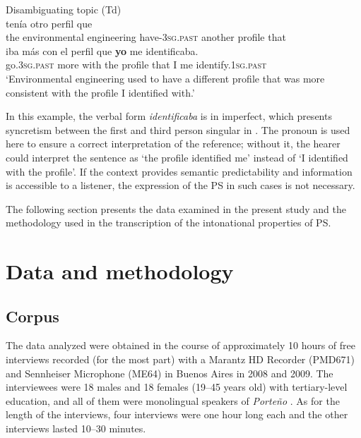 \documentclass[output=paper]{langsci/langscibook}
\begin{document}
\ea\label{ex:pes:9}
             Disambiguating topic (Td)\\
\gll{} tenía otro perfil    que\\
     the environmental engineering  have-\textsc{3sg}.\textsc{past} another profile  that\\
     
\gll  iba         más  con el perfil    que \textbf{{yo}} me  identificaba.\\
     go.\textsc{3sg}.\textsc{past}  more with the profile  that  I  me  identify.\textsc{1sg}.\textsc{past}\\
\glt ‘Environmental engineering used to have a different profile that was more consistent with the profile I identified with.’
\z

In this example, the verbal form \textit{identificaba} is in imperfect, which presents syncretism between the first and third person singular in . The pronoun is used here to ensure a correct interpretation of the reference; without it, the hearer could interpret the sentence as ‘the profile identified me’ instead of ‘I identified with the profile’. If the context provides semantic predictability and information is accessible to a listener, the expression of the PS in such cases is not necessary.

The following section presents the data examined in the present study and the methodology used in the transcription of the intonational properties of PS.

\section{Data and methodology}
\label{sec:pes:3}
\subsection{Corpus}
\label{sec:pes:3.1}
The data analyzed were obtained in the course of approximately 10 hours of free interviews recorded (for the most part) with a Marantz HD Recorder (PMD671) and Sennheiser Microphone (ME64) in Buenos Aires in 2008 and 2009. The interviewees were 18 males and 18 females (19–45 years old) with tertiary-level education, and all of them were monolingual speakers of \textit{Porte{\~n}o} . As for the length of the interviews, four interviews were one hour long each and the other interviews lasted 10–30 minutes.\largerpage
\end{document}
